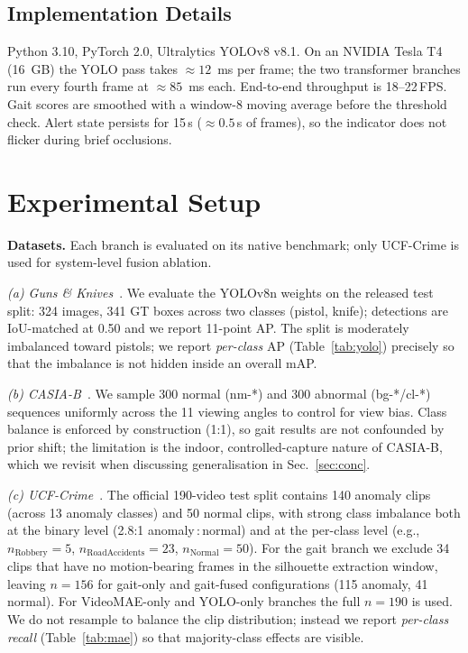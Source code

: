 \documentclass[runningheads]{llncs}
\begin{document}
\begin{algorithm}[!htbp]
\subsection{Implementation Details}

Python 3.10, PyTorch 2.0, Ultralytics YOLOv8 v8.1. On an NVIDIA Tesla T4 (16\, GB) the YOLO pass takes $\approx 12$\, ms per frame; the two transformer branches run every fourth frame at $\approx 85$\, ms each. End-to-end throughput is 18--22\,FPS. Gait scores are smoothed with a window-8 moving average before the threshold check. Alert state persists for 15\,s ($\approx 0.5$\,s of frames), so the indicator does not flicker during brief occlusions.

\FloatBarrier

\section{Experimental Setup}\label{sec:exp}

\textbf{Datasets.} Each branch is evaluated on its native benchmark; only UCF-Crime is used for system-level fusion ablation.

\emph{(a) Guns \& Knives}~\cite{gunsknives}. We evaluate the YOLOv8n weights on the released test split: 324 images, 341 GT boxes across two classes (pistol, knife); detections are IoU-matched at 0.50 and we report 11-point AP. The split is moderately imbalanced toward pistols; we report \emph{per-class} AP (Table~\ref{tab:yolo}) precisely so that the imbalance is not hidden inside an overall mAP.

\emph{(b) CASIA-B}~\cite{casiab}. We sample 300 normal (nm-*) and 300 abnormal (bg-*/cl-*) sequences uniformly across the 11 viewing angles to control for view bias. Class balance is enforced by construction (1:1), so gait results are not confounded by prior shift; the limitation is the indoor, controlled-capture nature of CASIA-B, which we revisit when discussing generalisation in Sec.~\ref{sec:conc}.

\emph{(c) UCF-Crime}~\cite{ucfcrime}. The official 190-video test split contains 140 anomaly clips (across 13 anomaly classes) and 50 normal clips, with strong class imbalance both at the binary level (2.8:1 anomaly\,:\,normal) and at the per-class level (e.g., $n_\text{Robbery}\!=\!5$, $n_\text{RoadAccidents}\!=\!23$, $n_\text{Normal}\!=\!50$). For the gait branch we exclude 34 clips that have no motion-bearing frames in the silhouette extraction window, leaving $n=156$ for gait-only and gait-fused configurations (115 anomaly, 41 normal). For VideoMAE-only and YOLO-only branches the full $n=190$ is used. We do not resample to balance the clip distribution; instead we report \emph{per-class recall} (Table~\ref{tab:mae}) so that majority-class effects are visible.


\end{algorithm}
\end{document}
